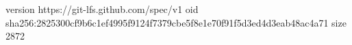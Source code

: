version https://git-lfs.github.com/spec/v1
oid sha256:2825300cf9b6c1ef4995f9124f7379cbe5f8e1e70f91f5d3ed4d3eab48ac4a71
size 2872
